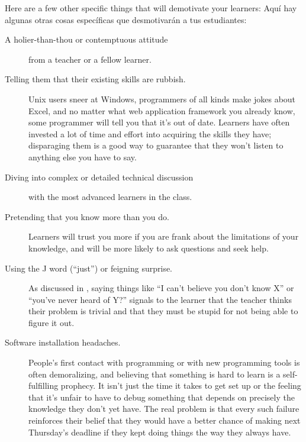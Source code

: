 Here are a few other specific things that will demotivate your learners:
Aquí hay algunas otras cosas específicas que desmotivarán a tus estudiantes:

\begin{description}

\item[A holier-than-thou or contemptuous attitude]
  from a teacher or a fellow learner.

\item[Telling them that their existing skills are rubbish.]
  Unix users sneer at Windows,
  programmers of all kinds make jokes about Excel,
  and no matter what web application framework you already know,
  some programmer will tell you that it's out of date.
  Learners have often invested a lot of time and effort into acquiring the skills they have;
  disparaging them is a good way to guarantee that
  they won't listen to anything else you have to say.

\item[Diving into complex or detailed technical discussion]
  with the most advanced learners in the class.

\item[Pretending that you know more than you do.]
  Learners will trust you more if you are frank about the limitations of your knowledge,
  and will be more likely to ask questions and seek help.

\item[Using the J word (``just'') or feigning surprise.]
  As discussed in ,
  saying things like ``I can't believe you don't know X'' or ``you've never heard of Y?''
  signals to the learner that
  the teacher thinks their problem is trivial
  and  that they must be stupid for not being able to figure it out.

\item[Software installation headaches.]
  People's first contact with programming or with new programming tools is often demoralizing,
  and believing that something is hard to learn is a self-fulfilling prophecy.
  It isn't just the time it takes to get set up
  or the feeling that it's unfair to have to debug something that depends on
  precisely the knowledge they don't yet have.
  The real problem is that every such failure reinforces their belief that
  they would have a better chance of making next Thursday's deadline
  if they kept doing things the way they always have.

\end{description}

